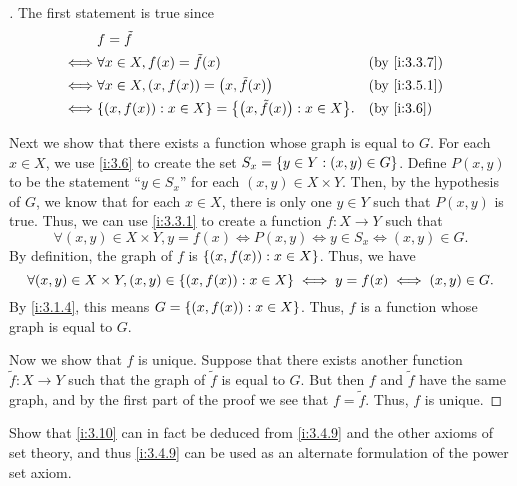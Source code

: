 \begin{proof}[]
  The first statement is true since
  \begin{align*}
         & f = \tilde{f}                                                                       \\
    \iff & \forall x \in X, f(x) = \tilde{f}(x)                              &  & \by{i:3.3.7} \\
    \iff & \forall x \in X, (x, f(x)) = \pa{x, \tilde{f}(x)}                 &  & \by{i:3.5.1} \\
    \iff & \set{(x, f(x)) : x \in X} = \set{\pa{x, \tilde{f}(x)} : x \in X}. &  & \by{i:3.6}
  \end{align*}

  Next we show that there exists a function whose graph is equal to \(G\).
  For each \(x \in X\), we use \cref{i:3.6} to create the set \(S_x = \left\lbrace y \in Y : (x, y) \in G\right\rbrace\).
  Define \(P(x, y)\) to be the statement ``\(y \in S_x\)'' for each \((x, y) \in X \times Y\).
  Then, by the hypothesis of \(G\), we know that for each \(x \in X\), there is only one \(y \in Y\) such that \(P(x, y)\) is true.
  Thus, we can use \cref{i:3.3.1} to create a function \(f : X \to Y\) such that
  \[
    \forall (x, y) \in X \times Y, y = f(x) \iff P(x, y) \iff y \in S_x \iff (x, y) \in G.
  \]
  By definition, the graph of \(f\) is \(\left\lbrace(x, f(x)) : x \in X\right\rbrace\).
  Thus, we have
  \[
    \forall (x, y) \in X \times Y, (x, y) \in \left\lbrace(x, f(x)) : x \in X\right\rbrace \iff y = f(x) \iff (x, y) \in G.
  \]
  By \cref{i:3.1.4}, this means \(G = \left\lbrace(x, f(x)) : x \in X\right\rbrace\).
  Thus, \(f\) is a function whose graph is equal to \(G\).

  Now we show that \(f\) is unique.
  Suppose that there exists another function \(\tilde{f} : X \to Y\) such that the graph of \(\tilde{f}\) is equal to \(G\).
  But then \(f\) and \(\tilde{f}\) have the same graph, and by the first part of the proof we see that \(f = \tilde{f}\).
  Thus, \(f\) is unique.
\end{proof}

\begin{ex}\label{i:ex:3.5.11}
  Show that \cref{i:3.10} can in fact be deduced from \cref{i:3.4.9} and the other axioms of set theory, and thus \cref{i:3.4.9} can be used as an alternate formulation of the power set axiom.
\end{ex}

